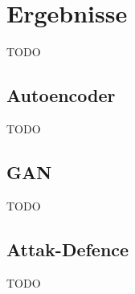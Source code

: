 \chapter{Ergebnisse}
\label{sec:Ergebnisse}
TODO

\section{Autoencoder}
TODO
\section{GAN}
TODO
\section{Attak-Defence}
TODO